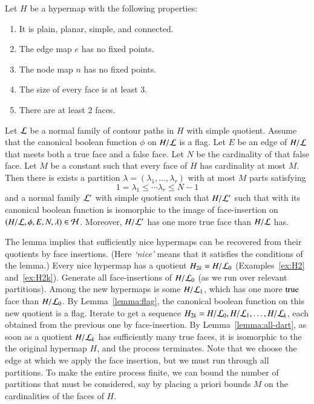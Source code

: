 \begin{theorem}  Let $H$ be a hypermap with the following properties:
    \begin{enumerate}
        \item It is plain, planar, simple, and connected.
        \item The edge map $e$ has no fixed points.
        \item The node map $n$ has no fixed points.
        \item The size of every face is at least $3$.
        \item There are at least $2$ faces. 
    \end{enumerate}
Let $\cal L$ be a normal family of contour paths in $H$ with
simple quotient. Assume that
the canonical boolean function $\phi$ on $H/{\cal L}$ is a flag. Let
$E$ be an edge of $H/{\cal L}$ that meets both a true face
and a false face. Let $N$ be the cardinality of that false face. Let
$M$ be a constant such that every face of $H$ has cardinality at
most $M$. Then there is exists a partition $\lambda=(\lambda_1,\ldots,\lambda_r)$ with at most
$M$ parts satisfying $$1=\lambda_1\le \cdots\lambda_r \le N-1$$
and a normal family
${\cal L}'$ with simple quotient such that $H/{\cal L}'$  such that
with its canonical boolean
function is isomorphic to the image of face-insertion on
$(H/{\cal L},\phi,E,N,\lambda)\in {\cal H}$. 
Moreover, $H/{\cal L}'$
has one more true face than $H/{\cal L}$ has.
\end{theorem}

\begin{remark}
\label{remark:nice-algorithm} 
The lemma implies that sufficiently nice hypermaps can be recovered
from their quotients by face insertions.  (Here {\it `nice'} means
that it satisfies the conditions of the lemma.)  
Every nice hypermap has a quotient 
$H_{2k}=H/{\cal L}_0$
(Examples~\ref{ex:H2} and~\ref{ex:H2k}).
Generate all face-insertions of $H/{\cal L}_0$ 
(as we run over relevant partitions).
Among the new hypermaps is some $H/{\cal L}_1$, which
has one more ${\operatorname{true}}$ face than $H/{\cal L}_0$.  By 
Lemma~\ref{lemma:flag}, 
the canonical boolean function on this new quotient
is a flag.  Iterate to get a sequence
$H_{2k} = H/{\cal L}_0, H/{\cal L}_1,\ldots, H/{\cal L}_k$,
each obtained from the previous one by face-insertion.
By Lemma~\ref{lemma:all-dart}, 
as
soon as a quotient $H/{\cal L}_k$ 
has sufficiently many true faces, it is
isomorphic to the the original hypermap $H$, and the process
terminates.
Note that we choose the edge at which we apply the face
insertion, but we must run through
all partitions.  To make the entire process finite, we can bound the
number of partitions that must be considered, say by placing a
priori bounds $M$ on the cardinalities of the faces of $H$.
\end{remark}

